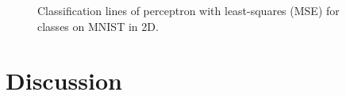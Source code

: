 \documentclass[journal]{IEEEtran}
\begin{document}
\begin{figure}
	\centering
	\caption{Classification lines of perceptron with least-squares (MSE) for classes on MNIST in 2D.}
	\label{fig:mnistperceptronlinemse2dpca}
\end{figure}



\section{Discussion}
















 
\end{document}
